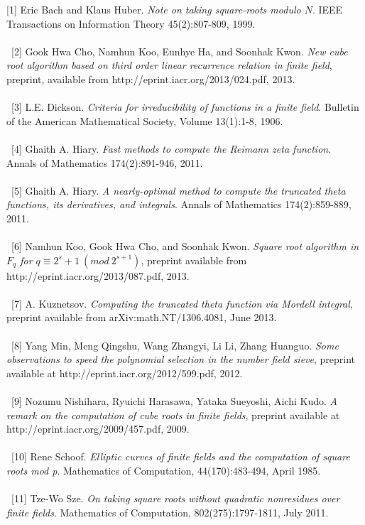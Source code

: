 \documentclass[final,letterpaper,oneside,10pt]{article}
\begin{document}
[1] Eric Bach and Klaus Huber. \textit{Note on taking square-roots modulo $N$}.  IEEE Transactions on Information Theory 45(2):807-809, 1999.
\\
\\
\
[2] Gook Hwa Cho, Namhun Koo, Eunhye Ha, and Soonhak Kwon. \textit{New cube root algorithm based on third order linear recurrence relation in
finite field}, preprint, available from http://eprint.iacr.org/2013/024.pdf, 2013.
\\
\\
\
[3] L.E. Dickson. \textit{Criteria for irreducibility of functions in a finite field}.  Bulletin of the American Mathematical Society, Volume 13(1):1-8, 1906.
\\
\\
\
[4] Ghaith A. Hiary. \textit{Fast methods to compute the Reimann zeta function}.  Annals of Mathematics 174(2):891-946, 2011.
\\
\\
\
[5] Ghaith A. Hiary. \textit{A nearly-optimal method to compute the truncated theta functions, its derivatives, and integrals}.  Annals of Mathematics 
174(2):859-889, 2011.
\\
\\
\
[6] Namhun Koo, Gook Hwa Cho, and Soonhak Kwon. \textit{Square root algorithm in $F_q$ for $q \equiv 2^s+1~(mod~2^{s+1})$}, preprint available
from 
\\
 http://eprint.iacr.org/2013/087.pdf, 2013.
\\
\\
\
[7]  A. Kuznetsov. \textit{Computing the truncated theta function via Mordell integral}, preprint available from arXiv:math.NT/1306.4081, June 2013.
\\
\\
\
[8] Yang Min, Meng Qingshu, Wang Zhangyi, Li Li, Zhang Huanguo. \textit{Some observations to speed the polynomial selection in the number field
sieve}, preprint available at http://eprint.iacr.org/2012/599.pdf, 2012.
\\
\\
\
[9] Nozumu Nishihara, Ryuichi Harasawa, Yataka Sueyoshi, Aichi Kudo. \textit{A remark on the computation of cube roots in finite fields}, preprint
available at http://eprint.iacr.org/2009/457.pdf, 2009.
\\
\\
\
[10] Rene Schoof. \textit{Elliptic curves of finite fields and the computation of square roots mod p}.  Mathematics of Computation, 44(170):483-494,
April 1985.
\\
\\
\
[11] Tze-Wo Sze. \textit{On taking square roots without quadratic nonresidues over finite fields}.  Mathematics of Computation, 802(275):1797-1811, 
July 2011.
\end{document}

